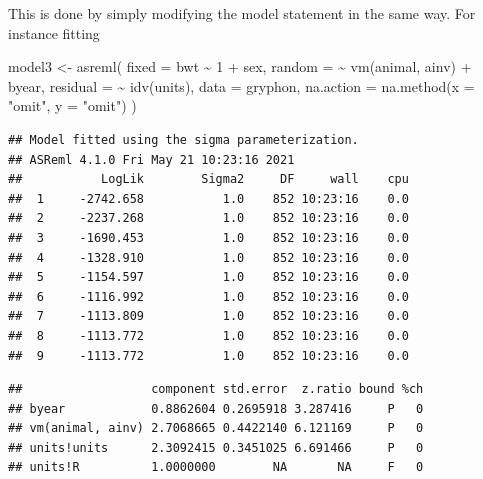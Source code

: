 \documentclass[
  12pt,
]{book}
\newenvironment{Shaded}{\begin{snugshade}}{\end{snugshade}}
\newcommand{\AttributeTok}[1]{\textcolor[rgb]{0.77,0.63,0.00}{#1}}
\newcommand{\DecValTok}[1]{\textcolor[rgb]{0.00,0.00,0.81}{#1}}
\newcommand{\FunctionTok}[1]{\textcolor[rgb]{0.00,0.00,0.00}{#1}}
\newcommand{\NormalTok}[1]{#1}
\newcommand{\OtherTok}[1]{\textcolor[rgb]{0.56,0.35,0.01}{#1}}
\newcommand{\SpecialCharTok}[1]{\textcolor[rgb]{0.00,0.00,0.00}{#1}}
\newcommand{\StringTok}[1]{\textcolor[rgb]{0.31,0.60,0.02}{#1}}
\begin{document}
This is done by simply modifying the model statement in the same way. For instance fitting

\begin{Shaded}
\begin{Highlighting}[]
\NormalTok{model3 }\OtherTok{\textless{}{-}} \FunctionTok{asreml}\NormalTok{(}
  \AttributeTok{fixed =}\NormalTok{ bwt }\SpecialCharTok{\textasciitilde{}} \DecValTok{1} \SpecialCharTok{+}\NormalTok{ sex,}
  \AttributeTok{random =} \SpecialCharTok{\textasciitilde{}} \FunctionTok{vm}\NormalTok{(animal, ainv) }\SpecialCharTok{+}\NormalTok{ byear,}
  \AttributeTok{residual =} \SpecialCharTok{\textasciitilde{}} \FunctionTok{idv}\NormalTok{(units),}
  \AttributeTok{data =}\NormalTok{ gryphon,}
  \AttributeTok{na.action =} \FunctionTok{na.method}\NormalTok{(}\AttributeTok{x =} \StringTok{"omit"}\NormalTok{, }\AttributeTok{y =} \StringTok{"omit"}\NormalTok{)}
\NormalTok{)}
\end{Highlighting}
\end{Shaded}

\begin{verbatim}
## Model fitted using the sigma parameterization.
## ASReml 4.1.0 Fri May 21 10:23:16 2021
##           LogLik        Sigma2     DF     wall    cpu
##  1     -2742.658           1.0    852 10:23:16    0.0
##  2     -2237.268           1.0    852 10:23:16    0.0
##  3     -1690.453           1.0    852 10:23:16    0.0
##  4     -1328.910           1.0    852 10:23:16    0.0
##  5     -1154.597           1.0    852 10:23:16    0.0
##  6     -1116.992           1.0    852 10:23:16    0.0
##  7     -1113.809           1.0    852 10:23:16    0.0
##  8     -1113.772           1.0    852 10:23:16    0.0
##  9     -1113.772           1.0    852 10:23:16    0.0
\end{verbatim}

\begin{Shaded}
\end{Shaded}

\begin{verbatim}
##                  component std.error  z.ratio bound %ch
## byear            0.8862604 0.2695918 3.287416     P   0
## vm(animal, ainv) 2.7068665 0.4422140 6.121169     P   0
## units!units      2.3092415 0.3451025 6.691466     P   0
## units!R          1.0000000        NA       NA     F   0
\end{verbatim}
\end{document}
